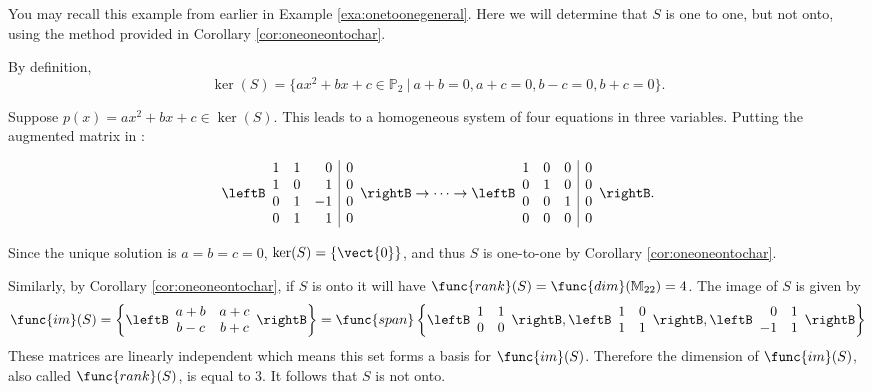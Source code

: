 \begin{solution}
You may recall this example from earlier in Example \ref{exa:onetoonegeneral}. Here we will determine that $S$ is one to one, but not onto, using the method provided in Corollary \ref{cor:oneoneontochar}.

By definition, 
\[ \ker(S)=\{ax^2+bx+c\in \mathbb{P}_2 ~|~ a+b=0,
a+c=0, b-c=0, b+c=0\}.\]

Suppose $p(x)=ax^2+bx+c\in\ker(S)$.
This leads to a homogeneous system of four equations in three 
variables.  
Putting the augmented matrix in \rref: 

\[ \leftB\begin{array}{rrr|c}
1 & 1 & 0 & 0  \\
1 & 0 & 1 & 0  \\
0 & 1 & -1 & 0  \\
0 & 1 & 1 & 0  \end{array}\rightB
\rightarrow \cdots \rightarrow
\leftB\begin{array}{ccc|c}
1 & 0 & 0 & 0  \\
0 & 1 & 0 & 0  \\
0 & 0 & 1 & 0  \\
0 & 0 & 0 & 0  \end{array}\rightB. \]

Since the unique solution is $a=b=c=0$, $\ker(S)=\{\vect{0}\}$, and thus
$S$ is one-to-one by Corollary \ref{cor:oneoneontochar}.

Similarly, by Corollary \ref{cor:oneoneontochar}, if $S$ is onto it will have $\func{rank}(S) = \func{dim}(\mathbb{M}_{22}) = 4$. The image of $S$ is given by 
\[
\func{im}(S) = \left\{ \leftB\begin{array}{cc}
a+b & a+c \\ b-c & b+c \end{array}\rightB \right\} = \func{span} \left\{ \leftB\begin{array}{rr}
1 & 1 \\
0 & 0 \end{array} \rightB, \leftB\begin{array}{rr}
1 & 0 \\
1 & 1 \end{array} \rightB, \leftB\begin{array}{rr}
0 & 1 \\
-1 & 1 \end{array} \rightB \right\}
\]
These matrices are linearly independent which means this set forms a basis for $\func{im}(S)$. Therefore the dimension of $\func{im}(S)$, also called $\func{rank}(S)$, is equal to $3$. It follows that $S$ is not onto. 
\end{solution}